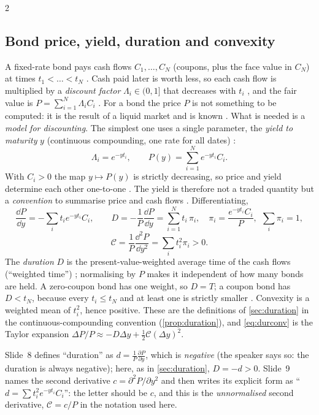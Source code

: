 \begin{paracol}{2}
\subsection{Bond price, yield, duration and convexity}\label{ch20:sec-yield}
A fixed-rate bond pays cash flows $C_1,\dots,C_N$ (coupons, plus the face value in $C_N$) at times $t_1<\dots<t_N$
. Cash paid later is worth less, so each cash flow is multiplied by a \emph{discount factor}
$\Lambda_i\in(0,1]$ that decreases with $t_i$ , and the fair value is
$P=\sum_{i=1}^N\Lambda_iC_i$ . For a bond the price $P$ is not something to be computed: it is the
result of a liquid market and is known . What is needed is a \emph{model for discounting}. The simplest one uses a single
parameter, the \emph{yield to maturity} $y$ (continuous compounding, one rate for all dates)
:
\begin{equation}\label{ch20:eq-yield}
  \Lambda_i=e^{-yt_i},\qquad P(y)=\sum_{i=1}^Ne^{-yt_i}C_i .
\end{equation}
With $C_i>0$ the map $y\mapsto P(y)$ is strictly decreasing, so price and yield determine each other one-to-one
. The yield is therefore not a traded quantity but a \emph{convention} to summarise price and
cash flows . Differentiating,
\[
  \frac{\dd P}{\dd y}=-\sum_it_ie^{-yt_i}C_i,\qquad
  D=-\frac1P\frac{\dd P}{\dd y}=\sum_{i=1}^Nt_i\,\pi_i,\quad \pi_i=\frac{e^{-yt_i}C_i}{P},\ \ \sum_i\pi_i=1,
\]
\[
  \mathcal C=\frac1P\frac{\dd^2P}{\dd y^2}=\sum_it_i^2\pi_i>0 .
\]
The \emph{duration} $D$ is the present-value-weighted average time of the cash flows (``weighted time'')
; normalising by $P$ makes it independent of how many bonds are held. A zero-coupon
bond has one weight, so $D=T$; a coupon bond has $D<t_N$, because every $t_i\le t_N$ and at least one is strictly smaller
. Convexity is a weighted mean of $t_i^2$, hence positive. These are the definitions of
\cref{sec:duration} in the continuous-compounding convention (\cref{prop:duration}), and \cref{eq:durconv} is the Taylor expansion
$\Delta P/P\approx-D\Delta y+\frac12\mathcal C(\Delta y)^2$.

\begin{coursenote}
Slide~8 defines ``duration'' as $d=\frac1P\frac{\partial P}{\partial y}$, which is \emph{negative} (the speaker says so:
the duration is always negative); here, as in \cref{sec:duration}, $D=-d>0$. Slide~9 names the second derivative $c=\partial^2P/\partial y^2$
and then writes its explicit form as ``$d=\sum t_i^2e^{-yt_i}C_i$'': the letter should be $c$, and this is the
\emph{unnormalised} second derivative, $\mathcal C=c/P$ in the notation used here.
\end{coursenote}


\end{paracol}
